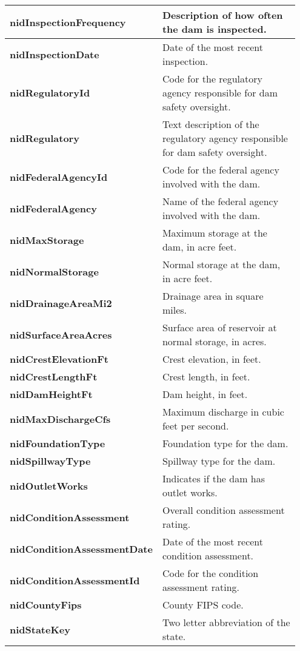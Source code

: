 \documentclass{article}
\begin{document}
\begin{longtable}{p{0.35\linewidth} p{0.6\linewidth}}
\textbf{nidInspectionFrequency} & Description of how often the dam is inspected. \\\hline
\textbf{nidInspectionDate} & Date of the most recent inspection. \\\hline
\textbf{nidRegulatoryId} & Code for the regulatory agency responsible for dam safety oversight. \\\hline
\textbf{nidRegulatory} & Text description of the regulatory agency responsible for dam safety oversight. \\\hline
\textbf{nidFederalAgencyId} & Code for the federal agency involved with the dam. \\\hline
\textbf{nidFederalAgency} & Name of the federal agency involved with the dam. \\\hline
\textbf{nidMaxStorage} & Maximum storage at the dam, in acre feet. \\\hline
\textbf{nidNormalStorage} & Normal storage at the dam, in acre feet. \\\hline
\textbf{nidDrainageAreaMi2} & Drainage area in square miles. \\\hline
\textbf{nidSurfaceAreaAcres} & Surface area of reservoir at normal storage, in acres. \\\hline
\textbf{nidCrestElevationFt} & Crest elevation, in feet. \\\hline
\textbf{nidCrestLengthFt} & Crest length, in feet. \\\hline
\textbf{nidDamHeightFt} & Dam height, in feet. \\\hline
\textbf{nidMaxDischargeCfs} & Maximum discharge in cubic feet per second. \\\hline
\textbf{nidFoundationType} & Foundation type for the dam. \\\hline
\textbf{nidSpillwayType} & Spillway type for the dam. \\\hline
\textbf{nidOutletWorks} & Indicates if the dam has outlet works. \\\hline
\textbf{nidConditionAssessment} & Overall condition assessment rating. \\\hline
\textbf{nidConditionAssessmentDate} & Date of the most recent condition assessment. \\\hline
\textbf{nidConditionAssessmentId} & Code for the condition assessment rating. \\\hline
\textbf{nidCountyFips} & County FIPS code. \\\hline
\textbf{nidStateKey} & Two letter abbreviation of the state. \\\hline

\end{longtable}
\end{document}
